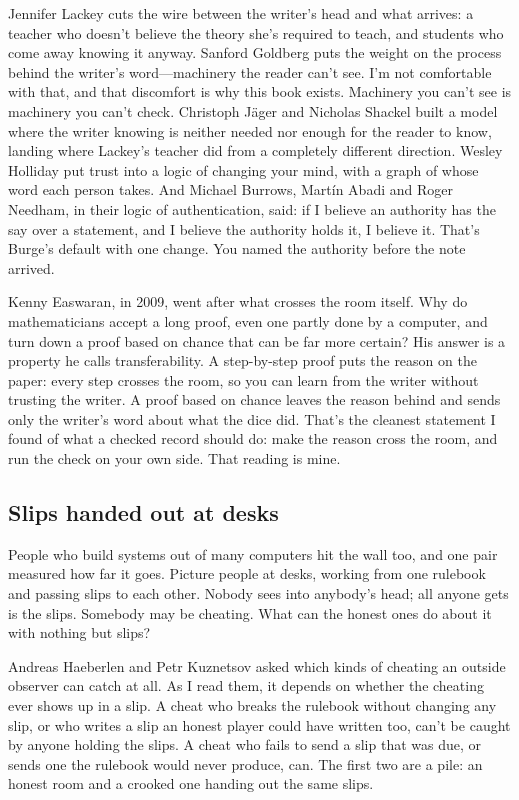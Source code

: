 \documentclass[11pt,twoside]{article}
\theoremstyle{thielethm}
\theoremstyle{thieledef}
\theoremstyle{thieledef}
\theoremstyle{thieledef}
\theoremstyle{thielethm}
\theoremstyle{thieleobs}
\theoremstyle{thielethm}
\begin{document}
Jennifer Lackey cuts the wire between the writer's head and what arrives: a teacher who doesn't believe the theory she's required to teach, and students who come away knowing it anyway. Sanford Goldberg puts the weight on the process behind the writer's word---machinery the reader can't see. I'm not comfortable with that, and that discomfort is why this book exists. Machinery you can't see is machinery you can't check. Christoph Jäger and Nicholas Shackel built a model where the writer knowing is neither needed nor enough for the reader to know, landing where Lackey's teacher did from a completely different direction. Wesley Holliday put trust into a logic of changing your mind, with a graph of whose word each person takes. And Michael Burrows, Martín Abadi and Roger Needham, in their logic of authentication, said: if I believe an authority has the say over a statement, and I believe the authority holds it, I believe it. That's Burge's default with one change. You named the authority before the note arrived.

Kenny Easwaran, in 2009, went after what crosses the room itself. Why do mathematicians accept a long proof, even one partly done by a computer, and turn down a proof based on chance that can be far more certain? His answer is a property he calls transferability. A step-by-step proof puts the reason on the paper: every step crosses the room, so you can learn from the writer without trusting the writer. A proof based on chance leaves the reason behind and sends only the writer's word about what the dice did. That's the cleanest statement I found of what a checked record should do: make the reason cross the room, and run the check on your own side. That reading is mine.

\subsection{Slips handed out at desks}

People who build systems out of many computers hit the wall too, and one pair measured how far it goes. Picture people at desks, working from one rulebook and passing slips to each other. Nobody sees into anybody's head; all anyone gets is the slips. Somebody may be cheating. What can the honest ones do about it with nothing but slips?

Andreas Haeberlen and Petr Kuznetsov asked which kinds of cheating an outside observer can catch at all. As I read them, it depends on whether the cheating ever shows up in a slip. A cheat who breaks the rulebook without changing any slip, or who writes a slip an honest player could have written too, can't be caught by anyone holding the slips. A cheat who fails to send a slip that was due, or sends one the rulebook would never produce, can. The first two are a pile: an honest room and a crooked one handing out the same slips.
\end{document}
